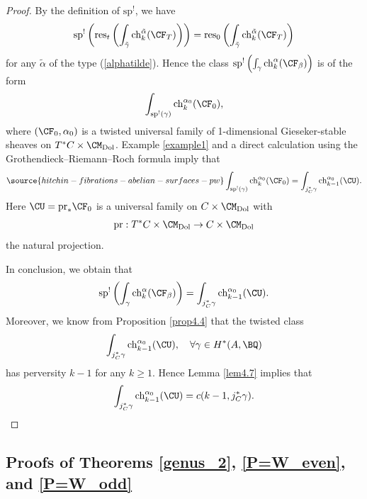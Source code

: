 \begin{proof}
By the definition of $\mathrm{sp}^!$, we have
\[
\mathrm{sp}^!\left( \mathrm{res}_t\left( \int_{\tilde{\gamma}} \mathrm{ch}_k^{\tilde{\alpha}} (\CF_T) \right)\right) = \mathrm{res}_0\left( \int_{\tilde{\gamma}} \mathrm{ch}_k^{\tilde{\alpha}} (\CF_T) \right)
\]
for any $\tilde{\alpha}$ of the type (\ref{alphatilde}). Hence the class $\mathrm{sp}^!\left( \int_{\gamma} \mathrm{ch}_k^\alpha (\CF_\beta) \right)$ is of the form
\[
\int_{\mathrm{sp}^!(\gamma)} \mathrm{ch}_k^{\alpha_0} (\CF_0),
\]
where $(\CF_0, \alpha_0)$ is a twisted universal family of 1-dimensional Gieseker-stable sheaves on $T^*C \times \CM_{\mathrm{Dol}}$. Example \ref{example1} and a direct calculation using the Grothendieck--Riemann--Roch formula imply that
\begin{equation*}\label{997}
\source{hitchin-fibrations-abelian-surfaces-pw}
\int_{\mathrm{sp}^!(\gamma)} \mathrm{ch}_k^{\alpha_0} (\CF_0) = \int_{j_C^*\gamma} \mathrm{ch}_{k-1}^{\alpha_0}(\CU).
\end{equation*}
Here $\CU = \mathrm{pr}_* \CF_0$ is a universal family on $C\times \CM_{\mathrm{Dol}}$ with
\[
\mathrm{pr}: T^*C\times \CM_{\mathrm{Dol}} \to C\times \CM_{\mathrm{Dol}}
\]
the natural projection.

In conclusion, we obtain that
\[
\mathrm{sp}^!\left( \int_{\gamma} \mathrm{ch}_k^\alpha (\CF_\beta) \right) = \int_{j_C^*\gamma} \mathrm{ch}_{k-1}^{\alpha_0}(\CU).
\]
Moreover, we know from Proposition \ref{prop4.4} that the twisted class \[
\int_{j_C^*\gamma} \mathrm{ch}_{k-1}^{\alpha_0}(\CU),\quad \forall \gamma \in H^*(A, \BQ)
\]
has perversity $k-1$ for any $k \geq 1$. Hence Lemma \ref{lem4.7} implies that
\[
\int_{j_C^*\gamma} \mathrm{ch}_{k-1}^{\alpha_0}(\CU) = c(k-1, j_C^*\gamma). \qedhere
\]
\end{proof}

\subsection{Proofs of Theorems \ref{genus_2}, \ref{P=W_even}, and \ref{P=W_odd}}\label{Section4.6}

